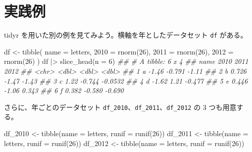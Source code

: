 \documentclass[
  letterpaper,
  xelatex,
  ja=standard, xelatex]{bxjsbook}
\newenvironment{Shaded}{\begin{snugshade}}{\end{snugshade}}
\newcommand{\AttributeTok}[1]{\textcolor[rgb]{0.40,0.45,0.13}{#1}}
\newcommand{\DecValTok}[1]{\textcolor[rgb]{0.68,0.00,0.00}{#1}}
\newcommand{\DocumentationTok}[1]{\textcolor[rgb]{0.37,0.37,0.37}{\textit{#1}}}
\newcommand{\FunctionTok}[1]{\textcolor[rgb]{0.28,0.35,0.67}{#1}}
\newcommand{\NormalTok}[1]{\textcolor[rgb]{0.00,0.23,0.31}{#1}}
\newcommand{\OtherTok}[1]{\textcolor[rgb]{0.00,0.23,0.31}{#1}}
\newcommand{\SpecialCharTok}[1]{\textcolor[rgb]{0.37,0.37,0.37}{#1}}
\newcommand{\StringTok}[1]{\textcolor[rgb]{0.13,0.47,0.30}{#1}}
\begin{document}
\section{実践例}\label{ux5b9fux8df5ux4f8b}

tidyr を用いた別の例を見てみよう。横軸を年としたデータセット \texttt{df}
がある。

\begin{Shaded}
\begin{Highlighting}[]
\NormalTok{df }\OtherTok{\textless{}{-}} \FunctionTok{tibble}\NormalTok{(}
  \AttributeTok{name  =}\NormalTok{ letters,}
  \StringTok{\textasciigrave{}}\AttributeTok{2010}\StringTok{\textasciigrave{}} \OtherTok{=} \FunctionTok{rnorm}\NormalTok{(}\DecValTok{26}\NormalTok{),}
  \StringTok{\textasciigrave{}}\AttributeTok{2011}\StringTok{\textasciigrave{}} \OtherTok{=} \FunctionTok{rnorm}\NormalTok{(}\DecValTok{26}\NormalTok{),}
  \StringTok{\textasciigrave{}}\AttributeTok{2012}\StringTok{\textasciigrave{}} \OtherTok{=} \FunctionTok{rnorm}\NormalTok{(}\DecValTok{26}\NormalTok{)}
\NormalTok{) }
\NormalTok{df }\SpecialCharTok{|\textgreater{}} \FunctionTok{slice\_head}\NormalTok{(}\AttributeTok{n =} \DecValTok{6}\NormalTok{)}
\DocumentationTok{\#\# \# A tibble: 6 x 4}
\DocumentationTok{\#\#   name  \textasciigrave{}2010\textasciigrave{} \textasciigrave{}2011\textasciigrave{}  \textasciigrave{}2012\textasciigrave{}}
\DocumentationTok{\#\#   \textless{}chr\textgreater{}  \textless{}dbl\textgreater{}  \textless{}dbl\textgreater{}   \textless{}dbl\textgreater{}}
\DocumentationTok{\#\# 1 a     {-}1.46  {-}0.791 {-}1.11  }
\DocumentationTok{\#\# 2 b      0.726 {-}1.47  {-}1.43  }
\DocumentationTok{\#\# 3 c      1.22  {-}0.744 {-}0.0532}
\DocumentationTok{\#\# 4 d     {-}1.62   1.21  {-}0.477 }
\DocumentationTok{\#\# 5 e      0.446 {-}1.06   0.343 }
\DocumentationTok{\#\# 6 f      0.382 {-}0.580 {-}0.690}
\end{Highlighting}
\end{Shaded}

さらに、年ごとのデータセット
\texttt{df\_2010}、\texttt{df\_2011}、\texttt{df\_2012} の 3
つも用意する。

\begin{Shaded}
\begin{Highlighting}[]
\NormalTok{df\_2010 }\OtherTok{\textless{}{-}} \FunctionTok{tibble}\NormalTok{(}\AttributeTok{name =}\NormalTok{ letters, }\AttributeTok{runif =} \FunctionTok{runif}\NormalTok{(}\DecValTok{26}\NormalTok{))}
\NormalTok{df\_2011 }\OtherTok{\textless{}{-}} \FunctionTok{tibble}\NormalTok{(}\AttributeTok{name =}\NormalTok{ letters, }\AttributeTok{runif =} \FunctionTok{runif}\NormalTok{(}\DecValTok{26}\NormalTok{))}
\NormalTok{df\_2012 }\OtherTok{\textless{}{-}} \FunctionTok{tibble}\NormalTok{(}\AttributeTok{name =}\NormalTok{ letters, }\AttributeTok{runif =} \FunctionTok{runif}\NormalTok{(}\DecValTok{26}\NormalTok{))}
\end{Highlighting}
\end{Shaded}
\end{document}
